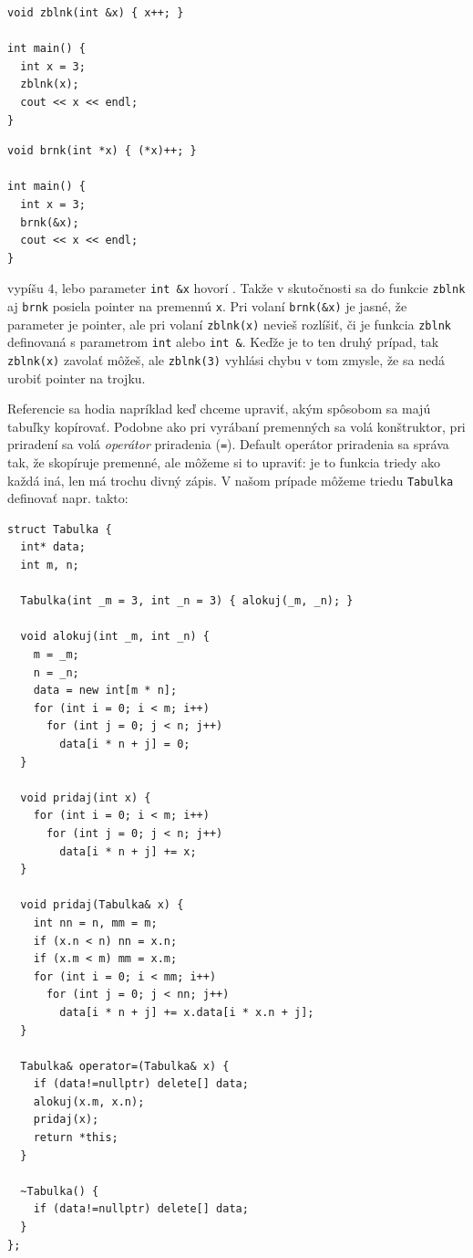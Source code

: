 \documentclass[10pt]{article}
\def\prg{\lstinline}
\def\ods{\vspace*{10pt}}
\def\bp{\begin{minipage}[t]{0.45\textwidth}\vspace{0pt}}
\def\ep{\end{minipage}}
\begin{document}
\bp
\begin{lstlisting}[] 
void zblnk(int &x) { x++; }

int main() {
  int x = 3;
  zblnk(x);
  cout << x << endl;
}
\end{lstlisting}
\ep
\hfill
\bp
\begin{lstlisting}[] 
void brnk(int *x) { (*x)++; }

int main() {
  int x = 3;
  brnk(&x);
  cout << x << endl;
}
\end{lstlisting}
\ep

vypíšu $4$, lebo parameter \prg!int &x! hovorí . Takže
v skutočnosti sa  do funkcie {\tt zblnk} aj {\tt brnk} posiela 
pointer na premennú {\tt x}. Pri volaní \prg!brnk(&x)! je jasné, že parameter je pointer,
ale pri volaní \prg!zblnk(x)! nevieš rozlíšiť, či je funkcia {\tt zblnk} definovaná
s parametrom \prg!int! alebo \prg!int &!. Keďže je to ten druhý prípad, tak
{\tt zblnk(x)} zavolať môžeš, ale
{\tt zblnk(3)} vyhlási chybu v tom zmysle, že sa nedá urobiť pointer na trojku.

\ods Referencie sa hodia napríklad keď chceme upraviť, akým spôsobom sa majú tabuľky 
kopírovať. Podobne ako pri vyrábaní premenných sa volá konštruktor, pri priradení
sa volá {\em operátor} priradenia ({\tt =}). Default operátor priradenia sa správa tak, 
že skopíruje premenné, ale môžeme si to upraviť: je to funkcia triedy ako každá iná, len
má trochu divný zápis. V našom prípade môžeme triedu {\tt Tabulka} definovať
napr. takto:

\begin{lstlisting}[] 
struct Tabulka {
  int* data;
  int m, n;
  
  Tabulka(int _m = 3, int _n = 3) { alokuj(_m, _n); }
  
  void alokuj(int _m, int _n) {
    m = _m; 
    n = _n;
    data = new int[m * n];
    for (int i = 0; i < m; i++)
      for (int j = 0; j < n; j++) 
        data[i * n + j] = 0;
  }

  void pridaj(int x) {
    for (int i = 0; i < m; i++)
      for (int j = 0; j < n; j++) 
        data[i * n + j] += x;
  }

  void pridaj(Tabulka& x) {
    int nn = n, mm = m;
    if (x.n < n) nn = x.n;
    if (x.m < m) mm = x.m;
    for (int i = 0; i < mm; i++)
      for (int j = 0; j < nn; j++) 
        data[i * n + j] += x.data[i * x.n + j];
  }

  Tabulka& operator=(Tabulka& x) {
    if (data!=nullptr) delete[] data;
    alokuj(x.m, x.n);
    pridaj(x);
    return *this;
  }

  ~Tabulka() { 
    if (data!=nullptr) delete[] data; 
  }
};
\end{lstlisting}
\end{document}
